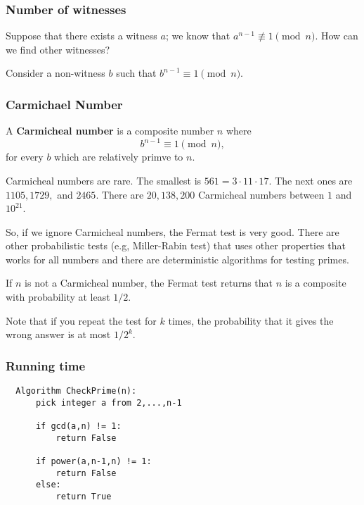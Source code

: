 \begin{frame}
  \frametitle{Number of witnesses}

  Suppose that there exists a witness $a$; we know that
  $a^{n-1}\not\equiv 1 \pmod n$.  How can we find other witnesses?

  \pause

  Consider a non-witness $b$ such that $b^{n-1}\equiv 1\pmod n$.

  \vspace{2in}

  
\end{frame}

\begin{frame}
  \frametitle{Carmichael Number}
  A {\bf Carmicheal number} is a composite number $n$ where
  \[
  b^{n-1}\equiv 1 \pmod n,
  \]
  for every $b$ which are relatively primve to $n$.

  \vspace{0.2in}
  {\small
  Carmicheal numbers are rare.  The smallest is $561=3\cdot 11\cdot
  17.$ The next ones are $1105, 1729,$ and $2465$.  There are
  $20,138,200$ Carmicheal numbers between $1$ and $10^{21}$.

  So, if we ignore Carmicheal numbers, the Fermat test is very good.
  There are other probabilistic tests (e.g, Miller-Rabin test) that
  uses other properties that works for all numbers and there are
  deterministic algorithms for testing primes.
  }
  
  \begin{lemma}
    If $n$ is not a Carmicheal number, the Fermat test returns that
    $n$ is a composite with probability at least $1/2$.
  \end{lemma}

  Note that if you repeat the test for $k$ times, the probability that
  it gives the wrong answer is at most $1/2^k$.
  
\end{frame}

\begin{frame}[fragile]
  \frametitle{Running time}
  \begin{tcolorbox}
  {\tiny
\begin{verbatim}
  Algorithm CheckPrime(n):
      pick integer a from 2,...,n-1

      if gcd(a,n) != 1:
          return False

      if power(a,n-1,n) != 1:
          return False
      else:
          return True
\end{verbatim}
  }
  \end{tcolorbox}

  \vspace{2in}
\end{frame}

